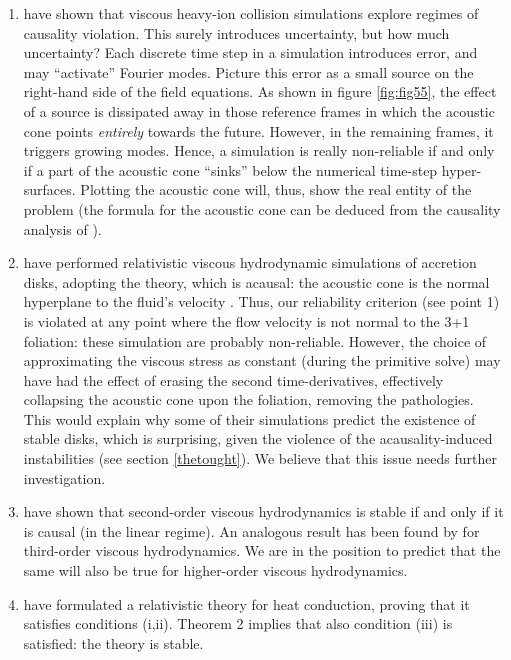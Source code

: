 \documentclass[a4paper, amsfonts, amssymb, amsmath, reprint, showkeys,  twoside, onecolumn,notitlepage,nofootinbib]{revtex4-1}
\theoremstyle{definition}
\theoremstyle{theorem}
\begin{document}
\begin{enumerate}
\item  \citet{Plumberg2021} have shown that viscous heavy-ion collision simulations explore regimes of causality violation. This surely introduces uncertainty, but how much uncertainty? Each discrete time step in a simulation introduces error, and may ``activate'' Fourier modes. Picture this error as a small source on the right-hand side of the field equations. As shown in figure \ref{fig:fig55}, the effect of a source is dissipated away in those reference frames in which the acoustic cone points \textit{entirely} towards the future. However, in the remaining frames, it triggers growing modes. Hence, a simulation is really non-reliable if and only if a part of the acoustic cone ``sinks'' below the numerical time-step hyper-surfaces. Plotting the acoustic cone will, thus, show the real entity of the problem (the formula for the acoustic cone can be deduced from the causality analysis of \citet{BemficaPRL2021}).
\item \citet{Fragile2018} have performed relativistic viscous hydrodynamic simulations of accretion disks, adopting the \citet{landau6} theory, which is acausal: the acoustic cone is the normal hyperplane to the fluid's velocity \cite{Kost2000}. Thus, our reliability criterion  (see point 1) is violated at any point where the flow velocity is not normal to the 3+1 foliation: these simulation are probably non-reliable. However, the choice of approximating the viscous stress as constant (during the primitive solve) may have had the effect of erasing the second time-derivatives, effectively collapsing the acoustic cone upon the foliation, removing the pathologies. This would explain why some of their simulations predict the existence of stable disks, which is surprising, given the violence of the acausality-induced instabilities (see section \ref{thetought}). We believe that this issue needs further investigation. 
\item \citet{Pu2010} have shown that second-order viscous hydrodynamics is stable if and only if it is causal (in the linear regime). An analogous result has been found by \citet{BrutoThird2021} for third-order viscous hydrodynamics. We are in the position to predict that the same will also be true for higher-order viscous hydrodynamics. 
\item \citet{Lopez11} have formulated a relativistic theory for heat conduction, proving that it satisfies conditions (i,ii). Theorem 2 implies that also condition (iii) is satisfied: the theory is stable.

\end{enumerate}
\end{document}
